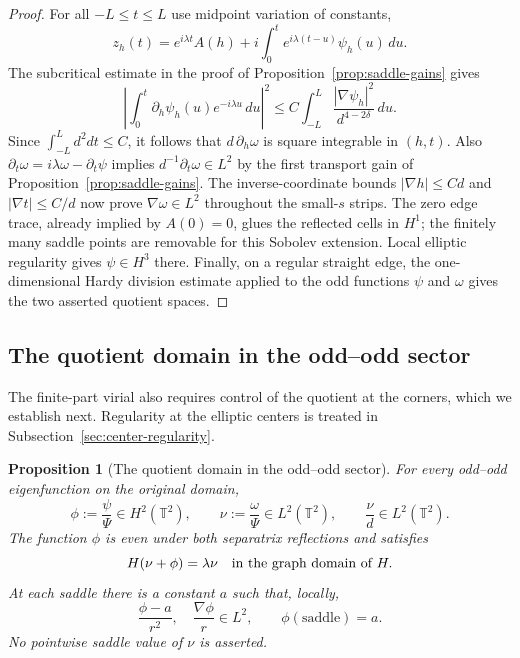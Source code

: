 \documentclass[reqno,11pt]{amsart}
\numberwithin{equation}{section}
\newtheorem{proposition}[theorem]{Proposition}
\theoremstyle{remark}
\begin{document}
\begin{proof}
For all $-L\leq t\leq L$ use midpoint variation of constants,
\[
 z_h(t)=e^{i\lambda t}A(h)
       +i\int_0^t e^{i\lambda(t-u)}\psi_h(u)\,du.
\]
The subcritical estimate in the proof of
Proposition~\ref{prop:saddle-gains} gives
\[
 \left|\int_0^t\partial_h\psi_h(u)e^{-i\lambda u}\,du\right|^2
 \leq C\int_{-L}^L\frac{|\nabla\psi_h|^2}{d^{4-2\delta}}\,du.
\]
Since $\int_{-L}^Ld^2dt\leq C$, it follows that
$d\,\partial_h\omega$ is square integrable in $(h,t)$.
Also $\partial_t\omega=i\lambda\omega-\partial_t\psi$ implies
$d^{-1}\partial_t\omega\in L^2$ by the first transport gain of
Proposition~\ref{prop:saddle-gains}.
The inverse-coordinate bounds $|\nabla h|\leq Cd$ and
$|\nabla t|\leq C/d$ now prove $\nabla\omega\in L^2$ throughout
the small-$s$ strips.  The zero edge trace, already implied by
$A(0)=0$, glues the reflected cells in $H^1$; the finitely many
saddle points are removable for this Sobolev extension.
Local elliptic regularity gives $\psi\in H^3$ there.
Finally, on a regular straight edge, the one-dimensional Hardy
division estimate applied to the odd functions $\psi$ and
$\omega$ gives the two asserted quotient spaces.
\end{proof}

\subsection{The quotient domain in the odd--odd sector}

The finite-part virial also requires control of the quotient at the
corners, which we establish next. Regularity at the elliptic centers
is treated in Subsection~\ref{sec:center-regularity}.

\begin{proposition}[The quotient domain in the odd--odd sector]
\label{prop:dd-quotient-domain}
For every odd--odd eigenfunction on the original domain,
\begin{equation}
 \phi:=\frac{\psi}{\Psi}\in H^2(\mathbb T^2),\qquad
 \nu:=\frac{\omega}{\Psi}\in L^2(\mathbb T^2),\qquad
 \frac{\nu}{d}\in L^2(\mathbb T^2).
 \label{eq:dd-quotient-domain}
\end{equation}
The function $\phi$ is even under both separatrix reflections and
satisfies
\begin{equation}
 H(\nu+\phi)=\lambda\nu
 \quad\hbox{in the graph domain of }H.
 \label{eq:quotient-transport-domain}
\end{equation}
At each saddle there is a constant $a$ such that, locally,
\begin{equation}
 \frac{\phi-a}{r^2},\quad\frac{\nabla\phi}{r}\in L^2,
 \qquad \phi(\text{saddle})=a.
 \label{eq:quotient-corner-domain}
\end{equation}
No pointwise saddle value of $\nu$ is asserted.
\end{proposition}
\end{document}
